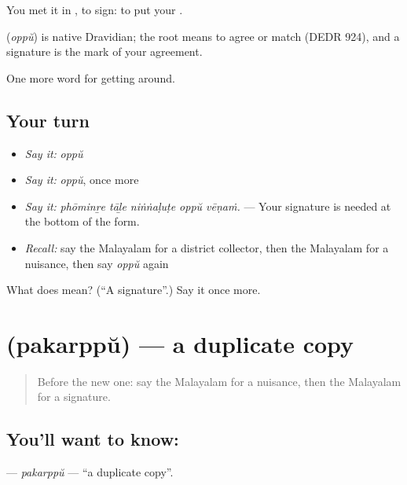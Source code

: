 You met it in , to sign: to put your .

\begin{cousinweb}
\textbf{} (\emph{oppŭ}) is native Dravidian; the root means to agree or match (DEDR 924), and a signature is the mark of your agreement.
\end{cousinweb}

\begin{grammarlens}[title={What you've built}]
One more word for getting around.
\end{grammarlens}

\subsection*{Your turn}
\begin{itemize}
\raggedright
  \item \emph{Say it:} \emph{oppŭ}
  \item \emph{Say it:} \emph{oppŭ}, once more
  \item \emph{Say it:} \emph{phōminṟe tāḻe niṅṅaḷuṭe oppŭ vēṇaṁ.} — Your signature is needed at the bottom of the form.
  \item \emph{Recall:} say the Malayalam for a district collector, then the Malayalam for a nuisance, then say \emph{oppŭ} again
\end{itemize}

\begin{tcolorbox}[breakable,colback=teal!4,colframe=teal!35!black,title={Before you move on}]
What does  mean? (\textquotedblleft{}A signature\textquotedblright{}.) Say it once more.
\end{tcolorbox}
\section[\texorpdfstring{\ml{പകർപ്പ്} (pakarppŭ)}{പകർപ്പ് (pakarppŭ)}]{ (pakarppŭ) — a duplicate copy}

\label{lesson:ML-C488-pakarppu}



\begin{quote}
Before the new one: say the Malayalam for a nuisance, then the Malayalam for a signature.
\end{quote}

\subsection*{You'll want to know: }
\textbf{} — \emph{pakarppŭ} — \textquotedblleft{}a duplicate copy\textquotedblright{}.

